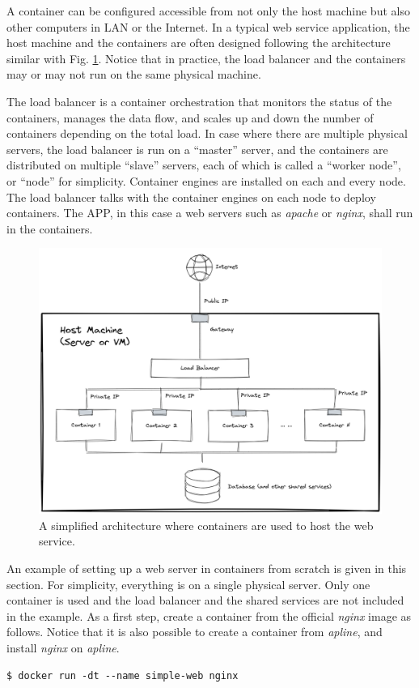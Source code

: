 A container can be configured accessible from not only the host machine but also other computers in LAN or the Internet. In a typical web service application, the host machine and the containers are often designed following the architecture similar with Fig. \ref{ch:vac:fig:containerwebserverarchitecture}. Notice that in practice, the load balancer and the containers may or may not run on the same physical machine.

The load balancer is a container orchestration that monitors the status of the containers, manages the data flow, and scales up and down the number of containers depending on the total load. In case where there are multiple physical servers, the load balancer is run on a ``master'' server, and the containers are distributed on multiple ``slave'' servers, each of which is called a ``worker node'', or ``node'' for simplicity. Container engines are installed on each and every node. The load balancer talks with the container engines on each node to deploy containers. The APP, in this case a web servers such as \textit{apache} or \textit{nginx}, shall run in the containers.
\begin{figure}
	\centering
	\includegraphics[width=350pt]{chapters/ch-virtualization-and-containerization/figures/containerwebserverarchitecture.png}
	\caption{A simplified architecture where containers are used to host the web service.} \label{ch:vac:fig:containerwebserverarchitecture}
\end{figure}

An example of setting up a web server in containers from scratch is given in this section. For simplicity, everything is on a single physical server. Only one container is used and the load balancer and the shared services are not included in the example. As a first step, create a container from the official \textit{nginx} image as follows. Notice that it is also possible to create a container from \textit{apline}, and install \textit{nginx} on \textit{apline}.
\begin{lstlisting}
$ docker run -dt --name simple-web nginx
\end{lstlisting}


